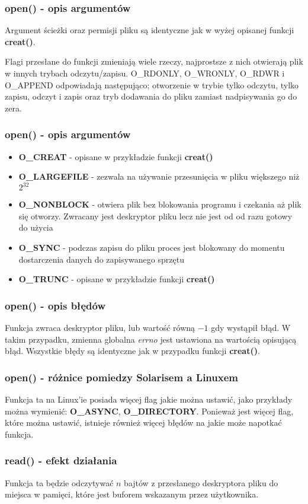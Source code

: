 \documentclass{beamer}
\begin{document}
\begin{frame}
	\frametitle{open() - opis argumentów}
Argument ścieżki oraz permisji pliku są identyczne jak w wyżej opisanej funkcji \textbf{creat()}.

Flagi przesłane do funkcji zmieniają wiele rzeczy, najprostsze z nich otwierają plik w innych trybach odczytu/zapisu.
O\_RDONLY, O\_WRONLY, O\_RDWR i O\_APPEND odpowiadają następująco; otworzenie w trybie tylko odczytu, tylko zapisu, odczyt i zapis oraz tryb dodawania do pliku zamiast nadpisywania go do zera.
\end{frame}

\begin{frame}
	\frametitle{open() - opis argumentów}
\begin{itemize}
\item \textbf{O\_CREAT} - opisane w przykładzie funkcji \textbf{creat()}
\item \textbf{O\_LARGEFILE} - zezwala na używanie przesunięcia w pliku większego niż $2^{32}$
\item \textbf{O\_NONBLOCK} - otwiera plik bez blokowania programu i czekania aż plik się otworzy. Zwracany jest deskryptor pliku lecz nie jest od od razu gotowy do użycia
\item \textbf{O\_SYNC} - podczas zapisu do pliku proces jest blokowany do momentu dostarczenia danych do zapisywanego sprzętu
\item \textbf{O\_TRUNC} - opisane w przykładzie funkcji \textbf{creat()}
\end{itemize}
\end{frame}

\begin{frame}
	\frametitle{open() - opis błędów}
Funkcja zwraca deskryptor pliku, lub wartość równą $-1$ gdy wystąpił błąd.
W takim przypadku, zmienna globalna \textit{errno} jest ustawiona na wartością opisującą błąd.
Wszystkie błędy są identyczne jak w przypadku funkcji \textbf{creat()}.
\end{frame}

\begin{frame}
	\frametitle{open() - różnice pomiedzy Solarisem a Linuxem}
Funkcja ta na Linux'ie posiada więcej flag jakie można ustawić, jako przykłady można wymienić: \textbf{O\_ASYNC}, \textbf{O\_DIRECTORY}.
Ponieważ jest więcej flag, które można ustawić, istnieje również więcej błędów na jakie może napotkać funkcja. 
\end{frame}

\begin{frame}
	\frametitle{read() - efekt działania}
Funkcja ta będzie odczytywać $n$ bajtów z przesłanego deskryptora pliku do miejsca w pamięci,
które jest buforem wskazanym przez użytkownika.
\end{frame}
\end{document}
